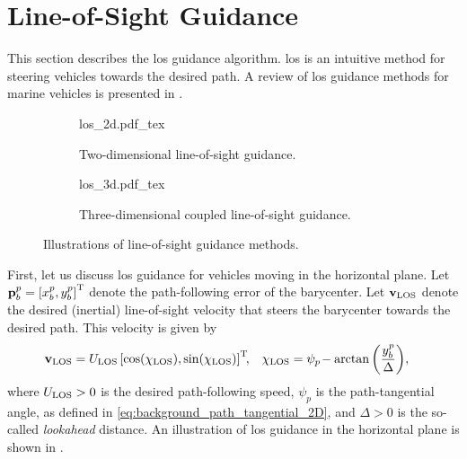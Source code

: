 \section{Line-of-Sight Guidance}
\label{sec:background_LOS}

This section describes the \gls{los} guidance algorithm.
\gls{los} is an intuitive method for steering vehicles towards the desired path.
A review of \gls{los} guidance methods for marine vehicles is presented in \cite{gu_LOS_2023}.

\begin{figure}[b]
    \centering
    \begin{subfigure}{0.48\textwidth}
        \centering
        \def\svgwidth{0.9\textwidth}
        {los_2d.pdf_tex}
        \caption{Two-dimensional line-of-sight guidance.}
        \label{fig:background_los_2d}
    \end{subfigure}
    \begin{subfigure}{0.48\textwidth}
        \def\svgwidth{\textwidth}
        {los_3d.pdf_tex}
        \caption{Three-dimensional coupled line-of-sight guidance.}
        \label{fig:background_los_3d}
    \end{subfigure}
    \caption{Illustrations of line-of-sight guidance methods.}
\end{figure}

First, let us discuss \gls{los} guidance for vehicles moving in the horizontal plane.
Let $\mathbf{p}_b^p = \left[x_b^p, y_b^p\right]^{\mathrm{T}}$ denote the path-following error of the barycenter.
Let $\mathbf{v}_{\rm LOS}$ denote the desired (inertial) line-of-sight velocity that steers the barycenter towards the desired path.
This velocity is given by \cite{fossen_handbook_2011,pettersen_waypoint_2001}
\begin{align}
    \mathbf{v}_{\rm LOS} &= U_{\rm LOS} \left[\cos(\chi_{\rm LOS}), \sin(\chi_{\rm LOS})\right]^{\mathrm{T}}\!\!, &
    \chi_{\rm LOS} &= \psi_{p\!} - \arctan\left(\frac{y_b^p}{\Delta}\right)\!,
    \label{eq:background_los_2d}
\end{align}
where $U_{\rm LOS} > 0$ is the desired path-following speed, $\psi_p$ is the path-tangential angle, as defined in \eqref{eq:background_path_tangential_2D}, and $\Delta > 0$ is the so-called \emph{lookahead} distance.
An illustration of \gls{los} guidance in the horizontal plane is shown in .

